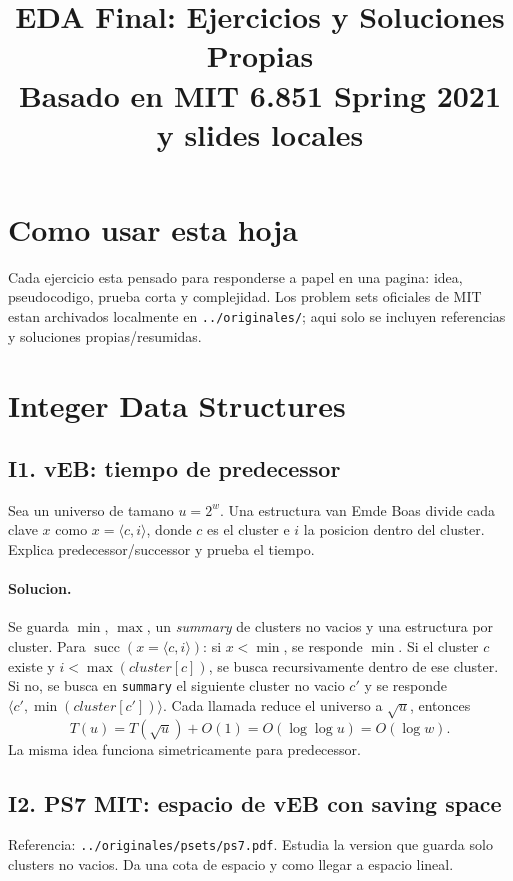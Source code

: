\documentclass[10pt]{article}
\title{EDA Final: Ejercicios y Soluciones Propias\\
\large Basado en MIT 6.851 Spring 2021 y slides locales}
\author{}
\date{}
\newcommand{\bigO}{O}
\newcommand{\succs}{\operatorname{succ}}
\begin{document}
\maketitle

\section*{Como usar esta hoja}
Cada ejercicio esta pensado para responderse a papel en una pagina: idea,
pseudocodigo, prueba corta y complejidad. Los problem sets oficiales de MIT
estan archivados localmente en \texttt{../originales/}; aqui solo se incluyen
referencias y soluciones propias/resumidas.

\section{Integer Data Structures}

\subsection*{I1. vEB: tiempo de predecessor}
Sea un universo de tamano $u = 2^w$. Una estructura van Emde Boas divide cada
clave $x$ como $x=\langle c,i\rangle$, donde $c$ es el cluster e $i$ la posicion
dentro del cluster. Explica predecessor/successor y prueba el tiempo.

\paragraph{Solucion.}
Se guarda $\min$, $\max$, un \emph{summary} de clusters no vacios y una
estructura por cluster. Para $\succs(x=\langle c,i\rangle)$:
si $x < \min$, se responde $\min$. Si el cluster $c$ existe y
$i < \max(cluster[c])$, se busca recursivamente dentro de ese cluster. Si no,
se busca en \texttt{summary} el siguiente cluster no vacio $c'$ y se responde
$\langle c', \min(cluster[c'])\rangle$. Cada llamada reduce el universo a
$\sqrt{u}$, entonces
\[
T(u)=T(\sqrt{u})+\bigO(1)=\bigO(\log\log u)=\bigO(\log w).
\]
La misma idea funciona simetricamente para predecessor.

\subsection*{I2. PS7 MIT: espacio de vEB con saving space}
Referencia: \texttt{../originales/psets/ps7.pdf}. Estudia la version que guarda
solo clusters no vacios. Da una cota de espacio y como llegar a espacio lineal.
\end{document}
